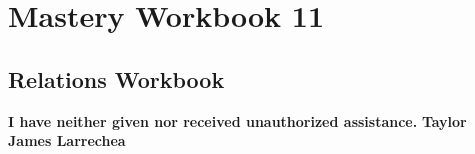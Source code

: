 \clearpage
\chapter{Mastery Workbook 11}

\section{Relations Workbook}


\begin{center}
    \Large{\textbf{I have neither given nor received unauthorized assistance.}}
    \large{\textbf{Taylor James Larrechea}}
\end{center}

